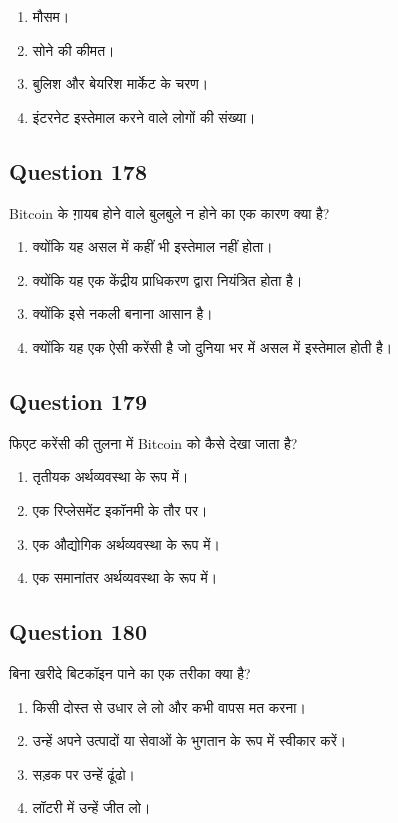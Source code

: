 \documentclass[12pt,a4paper]{article}
\begin{document}
\begin{enumerate}[label=\Alph*., leftmargin=*]
\item मौसम।
\item सोने की कीमत।
\item बुलिश और बेयरिश मार्केट के चरण।
\item इंटरनेट इस्तेमाल करने वाले लोगों की संख्या।
\end{enumerate}

\bigskip


\subsection*{Question 178}
Bitcoin के ग़ायब होने वाले बुलबुले न होने का एक कारण क्या है?

\begin{enumerate}[label=\Alph*., leftmargin=*]
\item क्योंकि यह असल में कहीं भी इस्तेमाल नहीं होता।
\item क्योंकि यह एक केंद्रीय प्राधिकरण द्वारा नियंत्रित होता है।
\item क्योंकि इसे नकली बनाना आसान है।
\item क्योंकि यह एक ऐसी करेंसी है जो दुनिया भर में असल में इस्तेमाल होती है।
\end{enumerate}

\bigskip


\subsection*{Question 179}
फिएट करेंसी की तुलना में Bitcoin को कैसे देखा जाता है?

\begin{enumerate}[label=\Alph*., leftmargin=*]
\item तृतीयक अर्थव्यवस्था के रूप में।
\item एक रिप्लेसमेंट इकॉनमी के तौर पर।
\item एक औद्योगिक अर्थव्यवस्था के रूप में।
\item एक समानांतर अर्थव्यवस्था के रूप में।
\end{enumerate}

\bigskip


\subsection*{Question 180}
बिना खरीदे बिटकॉइन पाने का एक तरीका क्या है?

\begin{enumerate}[label=\Alph*., leftmargin=*]
\item किसी दोस्त से उधार ले लो और कभी वापस मत करना।
\item उन्हें अपने उत्पादों या सेवाओं के भुगतान के रूप में स्वीकार करें।
\item सड़क पर उन्हें ढूंढो।
\item लॉटरी में उन्हें जीत लो।
\end{enumerate}
\end{document}
